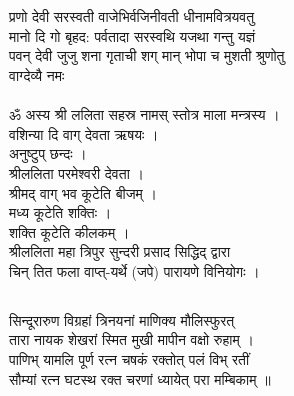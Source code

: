 \section{}
\subsection{}
प्रणो देवी सरस्वती वाजेभिर्वजिनीवती धीनामवित्रयवतु\\
मानो दि गो बृहद: पर्वतादा सरस्वथि यजथा गन्तु यज्ञं \\
पवन् देवी जुजु शना गृताची शग् मान् भोपा च मुशती श्रुणोतु \\
वाग्देव्यै नमः \\
\\
ॐ अस्य श्री ललिता सहस्र नामस् स्तोत्र माला मन्त्रस्य ।\\
वशिन्या दि वाग् देवता ऋषयः ।\\
अनुष्टुप् छन्दः ।\\
श्रीललिता परमेश्वरी देवता ।\\
श्रीमद् वाग् भव कूटेति बीजम् ।\\
मध्य कूटेति शक्तिः ।\\
शक्ति कूटेति कीलकम् ।\\
श्रीललिता महा त्रिपुर सुन्दरी प्रसाद सिद्धिद् द्वारा \\
चिन् तित फला वाप्त्-यर्थे (जपे) पारायणे विनियोगः ।\\
\subsection{}
सिन्दूरारुण विग्रहां त्रिनयनां माणिक्य मौलिस्फुरत्\\
तारा नायक शेखरां स्मित मुखी मापीन वक्षो रुहाम् ।\\
पाणिभ् यामलि पूर्ण रत्न चषकं रक्तोत् पलं विभ् रतीं\\
सौम्यां रत्न घटस्थ रक्त चरणां ध्यायेत् परा मम्बिकाम् ॥\\
